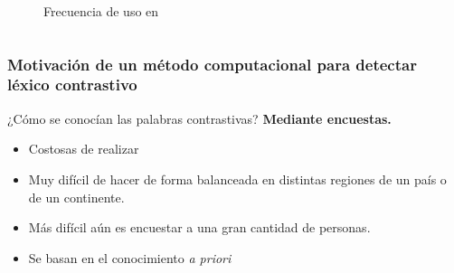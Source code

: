 \begin{frame}[t]
\begin{columns}[t]
\begin{column}{.48\textwidth}
\begin{figure}
                \caption{Frecuencia de uso en }
                \label{fig:jujuy}
            \end{figure} 
        \end{column}
    \end{columns}



\end{frame}

\begin{frame}[t]\frametitle{Motivación de un método computacional para detectar léxico contrastivo}
    
    ¿Cómo se conocían las palabras contrastivas?
    \textbf{Mediante encuestas.}
    \begin{itemize}
        \item Costosas de realizar
        \item Muy difícil de hacer de forma balanceada en distintas regiones de un país o de un continente.
        \item Más difícil aún es encuestar a una gran cantidad de personas.
        \item \alert{Se basan en el conocimiento \textit{a priori}}
    \end{itemize}
\end{frame}
